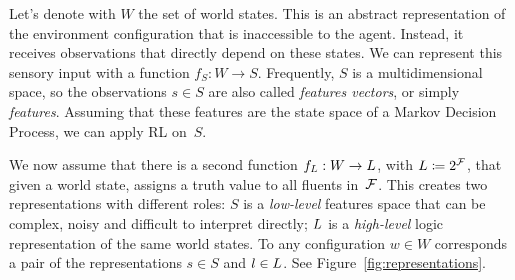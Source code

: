 Let's denote with $W$ the set of world states. This is an abstract
representation of the environment configuration that is inaccessible to the
agent. Instead, it receives observations that directly depend on these states.
We can represent this sensory input with a function $f_S: W \to S$.
Frequently, $S$ is a multidimensional space, so the observations $s \in S$ are
also called \emph{features vectors}, or simply \emph{features}. Assuming that
these features are the state space of a Markov Decision Process, we can apply
RL on~$S$.

We now assume that there is a second function $f_L: W \to
L$, with $L \coloneqq 2^{\mathcal{F}}$, that given a world
state, assigns a truth value to all fluents in~$\mathcal{F}$.  This creates two
representations with different roles: $S$ is a \emph{low-level} features space
that can be complex, noisy and difficult to interpret directly; $L$
is a \emph{high-level} logic representation of the same world states. To any
configuration $w \in W$ corresponds a pair of the representations $s \in S$
and $l \in L$. See Figure~\ref{fig:representations}.

